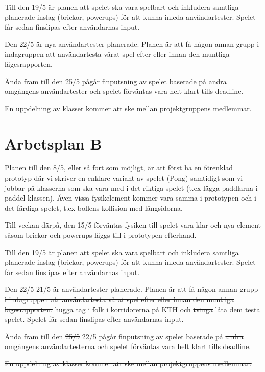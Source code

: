 \documentclass[a4paper,11pt]{article}
\begin{document}
\bigskip
\noindent Till den 19/5 är planen att spelet ska vara spelbart och inkludera samtliga planerade
inslag (brickor, powerups) för att kunna inleda användartester. Spelet får sedan finslipas
efter användarnas input.

\bigskip
\noindent Den 22/5 är nya användartester planerade. Planen är att få någon annan grupp i indagruppen att användartesta
vårat spel efter eller innan den muntliga lägesrapporten.

\bigskip
\noindent Ända fram till den 25/5 pågår finputsning av spelet baserade på andra omgångens användartester och spelet 
förväntas vara helt klart tills deadline.

\bigskip
\noindent En uppdelning av klasser kommer att ske mellan projektgruppens medlemmar.

\section{Arbetsplan B}
Planen till den 8/5, eller så fort som möjligt, är att först ha en förenklad prototyp där vi skriver
en enklare variant av spelet (Pong) samtidigt som vi jobbar  på klasserna som ska vara med i det
riktiga spelet (t.ex lägga paddlarna i paddel-klassen). Även vissa fysikelement kommer vara samma i
prototypen och i det färdiga spelet, t.ex bollens kollision med långsidorna.

\bigskip
\noindent Till veckan därpå, den 15/5 förväntas fysiken till spelet vara klar och nya element såsom
brickor och powerups läggs till i prototypen efterhand.

\bigskip
\noindent Till den 19/5 är planen att spelet ska vara spelbart och inkludera samtliga planerade
inslag (brickor, powerups) \sout{för att kunna inleda användartester. Spelet får sedan finslipas
efter användarnas input.}

\bigskip
\noindent Den \sout{22/5} 21/5 är användartester planerade. Planen är att \sout{få någon annan grupp
i indagruppen att användartesta vårat spel efter eller innan den muntliga lägesrapporten.} hugga tag
i folk i korridorerna på KTH och \sout{tvinga} låta dem testa spelet. Spelet får sedan finslipas
efter användarnas input.

\bigskip
\noindent Ända fram till den \sout{25/5} 22/5 pågår finputsning av spelet baserade på \sout{andra
omgångens} användartesterna och spelet förväntas vara helt klart tills deadline.

\bigskip
\noindent \sout{En uppdelning av klasser kommer att ske mellan projektgruppens medlemmar.}
\end{document}
